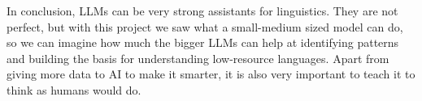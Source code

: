 \documentclass[
	a4paper, %
	10pt, %
	unnumberedsections, %
	twoside, %
]{LTJournalArticle}
\begin{document}
In conclusion, LLMs can be very strong assistants for linguistics. They are not perfect, but with this project we saw what a small-medium sized model can do, so we can imagine how much the bigger LLMs can help at identifying patterns and building the basis for understanding low-resource languages. Apart from giving more data to AI to make it smarter, it is also very important to teach it to think as humans would do.

\nocite{neacșu2024linguistics}
\printbibliography %

\end{document}
